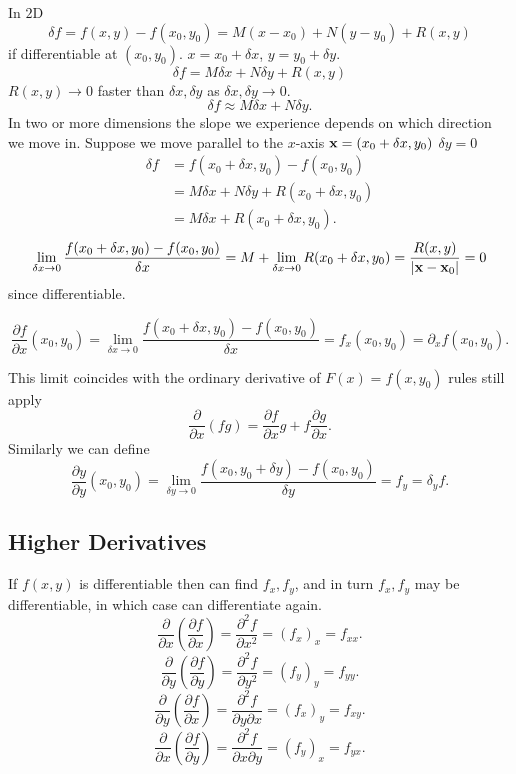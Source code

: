 \documentclass[10pt, a4paper]{article}
\begin{document}
In $2$D
\[
\delta f = f(x, y) - f(x_0, y_0) = M(x - x_0) + N(y - y_0) + R(x, y)
\]
if differentiable at $(x_0, y_0)$.
$x = x_0 + \delta x$,
$y = y_0 + \delta y$.
\[
\delta f = M\delta x + N\delta y + R(x, y)
\]
$R(x, y) \rightarrow 0$ faster than $\delta x, \delta y$ as $\delta x, \delta y \rightarrow 0$.
\[
\delta f \approx M\delta x + N\delta y.
\]
In two or more dimensions the slope we experience depends on which direction we move in.
Suppose we move parallel to the $x$-axis $\mathbf{x} = (x_0 + \delta x, y_0)$
$\delta y = 0$
\begin{align*}
    \delta f &= f(x_0 + \delta x, y_0) - f(x_0, y_0) \\
    &= M\delta x + N\delta y + R(x_0 + \delta x, y_0) \\
    &= M\delta x + R(x_0 + \delta x, y_0).
\end{align*}
\[
\lim_{\delta x \rightarrow 0}\frac{f(x_0 + \delta x, y_0) - f(x_0, y_0)}{\delta x} = M + \lim_{\delta x \rightarrow 0}R(x_0 + \delta x, y_0) = \frac{R(x, y)}{|\mathbf{x} - \mathbf{x}_0|} = 0
\]
since differentiable.
\begin{definition}
    \[
    \frac{\partial f}{\partial x}(x_0, y_0) = \lim_{\delta x \rightarrow 0}\frac{f(x_0 + \delta x, y_0) - f(x_0, y_0)}{\delta x} = f_x(x_0, y_0) = \partial_xf(x_0, y_0).
    \]
\end{definition}
This limit coincides with the ordinary derivative of $F(x) = f(x, y_0)$ rules still apply
\[
\frac{\partial}{\partial x}(fg) = \frac{\partial f}{\partial x}g + f\frac{\partial g}{\partial x}.
\]
Similarly we can define
\[
\frac{\partial y}{\partial y}(x_0, y_0) = \lim_{\delta y \rightarrow 0}\frac{f(x_0, y_0 + \delta y) - f(x_0, y_0)}{\delta y} = f_y = \delta_yf.
\]

\subsection{Higher Derivatives}
If $f(x, y)$ is differentiable then can find $f_x, f_y$,
and in turn $f_x, f_y$ may be differentiable,
in which case can differentiate again.
\[
\frac{\partial}{\partial x}\left(\frac{\partial f}{\partial x}\right) = \frac{\partial ^ 2f}{\partial x ^ 2} = (f_x)_x = f_{xx}.
\]
\[
\frac{\partial}{\partial y}\left(\frac{\partial f}{\partial y}\right) = \frac{\partial ^ 2f}{\partial y ^ 2} = (f_y)_y = f_{yy}.
\]
\[
\frac{\partial}{\partial y}\left(\frac{\partial f}{\partial x}\right) = \frac{\partial ^ 2f}{\partial y \partial x} = (f_x)_y = f_{xy}.
\]
\[
\frac{\partial}{\partial x}\left(\frac{\partial f}{\partial y}\right) = \frac{\partial ^ 2f}{\partial x \partial y} = (f_y)_x = f_{yx}.
\]
\end{document}
